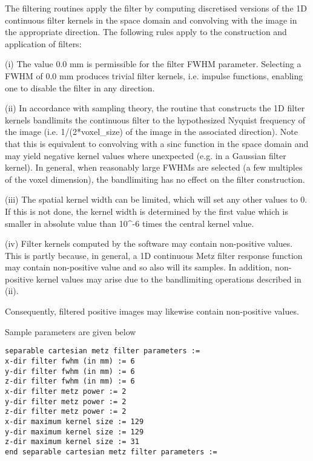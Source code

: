 \documentclass{article}
\begin{document}
The filtering routines apply the filter by computing discretised 
versions of the 1D continuous filter kernels in the space domain 
and convolving with the image in the appropriate direction. The 
following rules apply to the construction and application of 
filters:



(i) The value 0.0 mm is permissible for the filter FWHM parameter. 
Selecting a FWHM of 0.0 mm produces trivial filter kernels, i.e. 
impulse functions, enabling one to disable the filter in any 
direction. 



(ii) In accordance with sampling theory, the routine that constructs 
the 1D filter kernels bandlimits the continuous filter to the 
hypothesized Nyquist frequency of the image (i.e. 1/(2*voxel\_size) 
of the image in the associated direction). Note that this is 
equivalent to convolving with a sinc function in the space domain 
and may yield negative kernel values where unexpected (e.g. in 
a Gaussian filter kernel). In general, when reasonably large 
FWHMs are selected (a few multiples of the voxel dimension), 
the bandlimiting has no effect on the filter construction.



(iii) The spatial kernel width can be limited, which will set 
any other values to 0. If this is not done, the kernel width 
is determined by the first value which is smaller in absolute 
value than 10{\textasciicircum}-6 times the central kernel value.



(iv) Filter kernels computed by the software may contain non-positive 
values. This is partly because, in general, a 1D continuous Metz 
filter response function may contain non-positive value and so 
also will its samples. In addition, non-positive kernel values 
may arise due to the bandlimiting operations described in (ii). 



Consequently, filtered positive images may likewise contain non-positive 
values. 

{ 
}

Sample parameters are given below

\begin{verbatim}
separable cartesian metz filter parameters :=
x-dir filter fwhm (in mm) := 6
y-dir filter fwhm (in mm) := 6
z-dir filter fwhm (in mm) := 6
x-dir filter metz power := 2
y-dir filter metz power := 2
z-dir filter metz power := 2
x-dir maximum kernel size := 129
y-dir maximum kernel size := 129
z-dir maximum kernel size := 31
end separable cartesian metz filter parameters := 
\end{verbatim}
\end{document}
